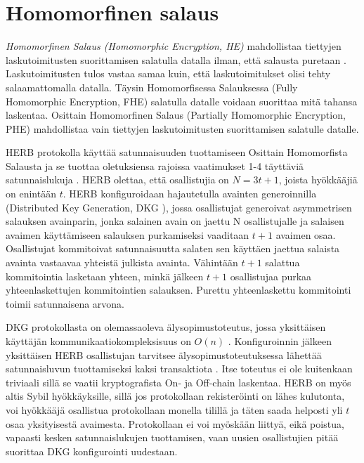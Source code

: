 \section{Homomorfinen salaus}

\textit{Homomorfinen Salaus (Homomorphic Encryption, HE)} mahdollistaa tiettyjen laskutoimitusten suorittamisen salatulla datalla ilman, että salausta puretaan \cite{alma9928100443506253}. Laskutoimitusten tulos vastaa samaa kuin, että laskutoimitukset olisi tehty salaamattomalla datalla. Täysin Homomorfisessa Salauksessa (Fully Homomorphic Encryption, FHE) salatulla datalle voidaan suorittaa mitä tahansa laskentaa. Osittain Homomorfinen Salaus (Partially Homomorphic Encryption, PHE) mahdollistaa vain tiettyjen laskutoimitusten suorittamisen salatulle datalle.

HERB protokolla käyttää satunnaisuuden tuottamiseen Osittain Homomorfista Salausta ja se tuottaa oletuksiensa rajoissa vaatimukset 1-4 täyttäviä satunnaislukuja \cite{cherniaeva2019homomorphic}. HERB olettaa, että osallistujia on $N=3t+1$, joista hyökkääjiä on enintään $t$. HERB konfiguroidaan hajautetulla avainten generoinnilla (Distributed Key Generation, DKG \cite{pedersen1991threshold}), jossa osallistujat generoivat asymmetrisen salauksen avainparin, jonka salainen avain on jaettu N osallistujalle ja salaisen avaimen käyttämiseen salauksen purkamiseksi vaaditaan $t+1$ avaimen osaa. Osallistujat kommitoivat satunnaisuutta salaten sen käyttäen jaettua salaista avainta vastaavaa yhteistä julkista avainta. Vähintään $t+1$ salattua kommitointia lasketaan yhteen, minkä jälkeen $t+1$ osallistujaa purkaa yhteenlaskettujen kommitointien salauksen. Purettu yhteenlaskettu kommitointi toimii satunnaisena arvona. 

DKG protokollasta on olemassaoleva älysopimustoteutus, jossa yksittäisen käyttäjän kommunikaatiokompleksisuus on $O(n)$ \cite{schindler2019ethdkg}. Konfiguroinnin jälkeen yksittäisen HERB osallistujan tarvitsee älysopimustoteutuksessa lähettää satunnaisluvun tuottamiseksi kaksi transaktiota \cite{cherniaeva2019homomorphic}. Itse toteutus ei ole kuitenkaan triviaali sillä se vaatii kryptografista On- ja Off-chain laskentaa. HERB on myös altis Sybil hyökkäyksille, sillä jos protokollaan rekisteröinti on lähes kulutonta, voi hyökkääjä osallistua protokollaan monella tilillä ja täten saada helposti yli $t$ osaa yksityisestä avaimesta. Protokollaan ei voi myöskään liittyä, eikä poistua, vapaasti kesken satunnaislukujen tuottamisen, vaan uusien osallistujien pitää suorittaa DKG konfigurointi uudestaan. 

